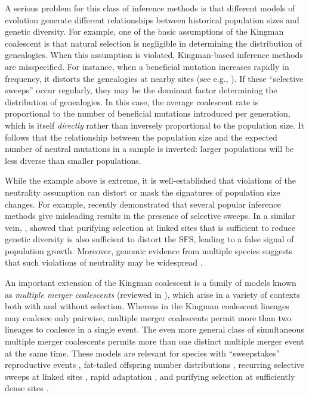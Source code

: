 \documentclass[11pt, letterpaper]{article}   	%
\begin{document}
A serious problem for this class of inference methods is that different models of evolution generate different relationships between historical population sizes and genetic diversity.
For example, one of the basic assumptions of the Kingman coalescent is that natural selection is negligible in determining the distribution of genealogies.
When this assumption is violated, Kingman-based inference methods are misspecified.
For instance, when a beneficial mutation increases rapidly in frequency, it distorts the genealogies at nearby sites (see e.g., \cite{CoopRalph2012}).
If these ``selective sweeps'' occur regularly, they may be the dominant factor determining the distribution of genealogies.
In this case, the average coalescent rate is proportional to the number of beneficial mutations introduced per generation, which is itself \emph{directly} rather than inversely proportional to the population size.
It follows that the relationship between the population size and the expected number of neutral mutations in a sample is inverted: larger populations will be less diverse than smaller populations.

While the example above is extreme, it is well-established that violations of the neutrality assumption can distort or mask the signatures of population size changes.
For example, \cite{SchriderEtAl2016} recently demonstrated that several popular inference methods give misleading results in the presence of selective sweeps.
In a similar vein, \cite{CvijovicEtAl2018}, showed that purifying selection at linked sites that is sufficient to reduce genetic diversity is also sufficient to distort the SFS, leading to a false signal of population growth.
Moreover, genomic evidence from multiple species suggests that such violations of neutrality may be widespread \autocite{SellaEtAl2009, Corbett-DetigEtAl2015, KernHahn2018}.

An important extension of the Kingman coalescent is a family of models known as \textit{multiple merger coalescents} \autocite{Pitman1999, Sagitov1999, DonnellyKurtz1999,} (reviewed in \cite{Eldon2016}), which arise in a variety of contexts both with and without selection.
Whereas in the Kingman coalescent lineages may coalesce only pairwise, multiple merger coalescents permit more than two lineages to coalesce in a single event.
The even more general class of simultaneous multiple merger coalescents \autocite{Schweinsberg2000, MohleSagitov2001, Sagitov2003} permits more than one distinct multiple merger event at the same time.
These models are relevant for species with
``sweepstakes'' reproductive events \autocite{EldonWakeley2006, SargsyanWakeley2008},
fat-tailed offspring number distributions \autocite{Schweinsberg2003},
recurring selective sweeps at linked sites \autocite{DurrettSchweinsberg2005, CoopRalph2012},
rapid adaptation \autocite{NeherHallatscheck2013, DesaiEtAl},
and purifying selection at sufficiently dense sites \autocite{Seger, Good, Nicholaisen}.
\end{document}
